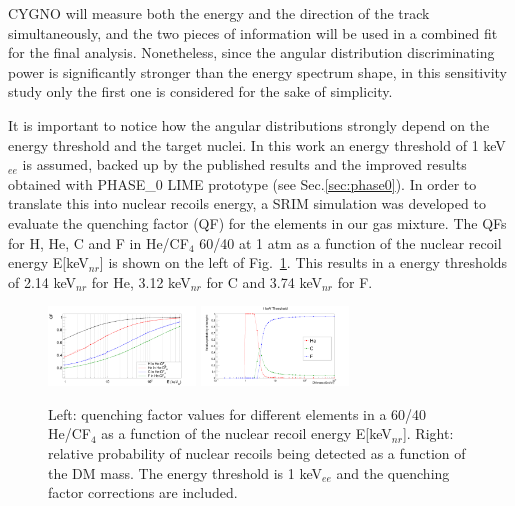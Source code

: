 \documentclass[physics,article,submit,moreauthors,pdftex]{Definitions/mdpi}
\begin{document}
CYGNO will measure both the energy and the direction of the track simultaneously, and the two pieces of information will be used in a combined fit for the final analysis. Nonetheless, since the angular distribution discriminating power is significantly stronger than the energy spectrum shape, in this sensitivity study only the first one is considered for the sake of simplicity. 

It is important to notice how the angular distributions strongly depend on the energy threshold and the target nuclei. In this work an energy threshold of 1 keV$_{ee}$ is assumed, backed up by the published results \cite{bib:fe55} and the improved results obtained with PHASE\_0 LIME prototype (see Sec.\ref{sec:phase0}). In order to translate this into nuclear recoils energy, a SRIM simulation was developed to evaluate the quenching factor (QF) for the elements in our gas mixture. The QFs for H, He, C and F in He/CF$_4$ 60/40 at 1 atm as a function of the nuclear recoil energy E[keV$_{nr}$] is shown on the left of Fig.~\ref{fig:QF_Probele}. This results in a energy thresholds of 2.14 keV$_{nr}$ for He, 3.12 keV$_{nr}$ for C and 3.74 keV$_{nr}$ for F.

\begin{figure}[!t]
\centering
 \includegraphics[width=0.35\textwidth]{QF.png}
 \includegraphics[width=0.35\textwidth]{Prob_hitting.png}
 \caption{Left: quenching factor values for different elements in a 60/40 He/CF$_4$ as a function of the nuclear recoil energy E[keV$_{nr}$]. Right: relative probability of nuclear recoils being detected as a function of the DM mass. The energy threshold is 1 keV$_{ee}$ and the quenching factor corrections are included.}
 \label{fig:QF_Probele}
 \end{figure}
\end{document}
